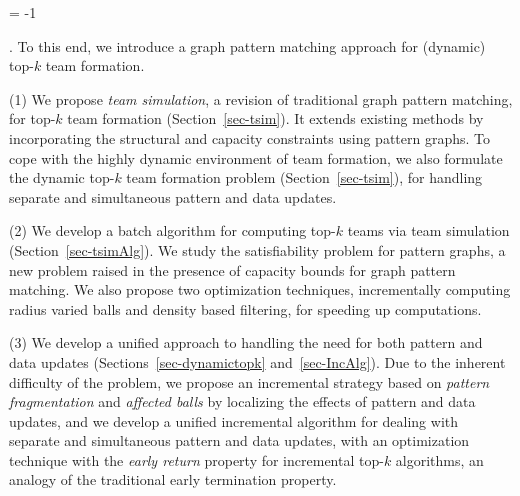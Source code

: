 \looseness = -1

. To this end,  we introduce a graph pattern matching approach for (dynamic) top-$k$ team formation.


\stab (1) We propose {\em team simulation}, a revision of traditional graph pattern matching, for top-$k$ team formation (Section~\ref{sec-tsim}).
It extends existing methods by incorporating the structural and capacity constraints using pattern graphs.
To cope with the highly dynamic environment of team formation, we also formulate the dynamic top-$k$ team formation problem  (Section~\ref{sec-tsim}), for handling separate and simultaneous pattern and data updates.




\stab (2) We develop a batch algorithm for computing top-$k$ teams via team simulation (Section~\ref{sec-tsimAlg}).
We study the satisfiability problem for pattern graphs, a new problem raised in the presence of capacity bounds for graph pattern matching.
We also propose two optimization techniques, incrementally computing radius varied balls and density based filtering, for speeding up computations.  



\stab (3) We develop a unified approach to handling the need for both pattern and data updates (Sections~\ref{sec-dynamictopk} and~\ref{sec-IncAlg}).
Due to the inherent difficulty of the problem, we propose an incremental strategy based on {\em pattern fragmentation} and {\em affected balls} by localizing the effects of pattern and data updates, and we develop a unified incremental algorithm for dealing with separate and simultaneous pattern and data updates,
with an optimization technique with the {\em early return} property for incremental top-$k$ algorithms, an analogy of the traditional early termination property.


